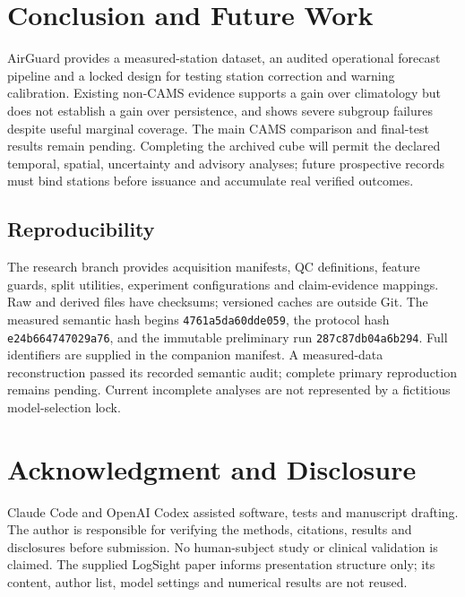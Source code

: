\section{Conclusion and Future Work}
AirGuard provides a measured-station dataset, an audited operational forecast
pipeline and a locked design for testing station correction and warning
calibration. Existing non-CAMS evidence supports a gain over climatology but
does not establish a gain over persistence, and shows severe subgroup failures
despite useful marginal coverage. The main CAMS comparison and final-test
results remain pending. Completing the archived cube will permit the declared
temporal, spatial, uncertainty and advisory analyses; future prospective records
must bind stations before issuance and accumulate real verified outcomes.
\subsection{Reproducibility}
The research branch provides acquisition manifests, QC definitions, feature
guards, split utilities, experiment configurations and claim-evidence mappings.
Raw and derived files have checksums; versioned caches are outside Git.
The measured semantic hash begins \texttt{4761a5da60dde059}, the protocol hash
\texttt{e24b664747029a76}, and the immutable preliminary run
\texttt{287c87db04a6b294}. Full identifiers are supplied in the companion manifest.
A measured-data reconstruction passed its recorded semantic audit; complete
primary reproduction remains pending. Current incomplete analyses are not
represented by a fictitious model-selection lock.

\section*{Acknowledgment and Disclosure}
Claude Code and OpenAI Codex assisted software, tests and manuscript drafting.
The author is responsible for verifying the methods, citations, results and
disclosures before submission. No human-subject study or clinical validation
is claimed. The supplied LogSight paper informs presentation structure only;
its content, author list, model settings and numerical results are not reused.
